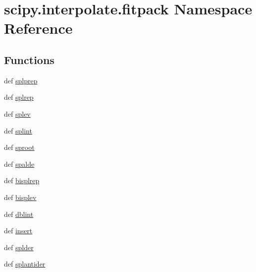 \hypertarget{namespacescipy_1_1interpolate_1_1fitpack}{}\section{scipy.\+interpolate.\+fitpack Namespace Reference}
\label{namespacescipy_1_1interpolate_1_1fitpack}
\subsection*{Functions}
\begin{DoxyCompactItemize}
\item 
def \hyperlink{namespacescipy_1_1interpolate_1_1fitpack_a6a052f827f80341f9aadade357c49c21}{splprep}
\item 
def \hyperlink{namespacescipy_1_1interpolate_1_1fitpack_a2423e02d061f11d96122b40b2919d3b8}{splrep}
\item 
def \hyperlink{namespacescipy_1_1interpolate_1_1fitpack_a4fd61bcdfd051a9c4407403db623f5ef}{splev}
\item 
def \hyperlink{namespacescipy_1_1interpolate_1_1fitpack_aee75c5d8f63bdadde1e775092428bf73}{splint}
\item 
def \hyperlink{namespacescipy_1_1interpolate_1_1fitpack_ad4d36dd0002fb4920b5a0f51a8d1e2ad}{sproot}
\item 
def \hyperlink{namespacescipy_1_1interpolate_1_1fitpack_a0600e77e68e37d78ad73ef571b1e1733}{spalde}
\item 
def \hyperlink{namespacescipy_1_1interpolate_1_1fitpack_a4c3a3eba5a81c9cb39c5e716372024bf}{bisplrep}
\item 
def \hyperlink{namespacescipy_1_1interpolate_1_1fitpack_acaf6a631cf8ff9bd445bd79a7cd2a364}{bisplev}
\item 
def \hyperlink{namespacescipy_1_1interpolate_1_1fitpack_a68a8aaf2184c6401ff114d739ee5dd08}{dblint}
\item 
def \hyperlink{namespacescipy_1_1interpolate_1_1fitpack_adc5d6b383e2e2e68e88cc7a15f26e82c}{insert}
\item 
def \hyperlink{namespacescipy_1_1interpolate_1_1fitpack_ab5d4a49b29435a9e5c6582c8f9089280}{splder}
\item 
def \hyperlink{namespacescipy_1_1interpolate_1_1fitpack_a5fc0ade95741252ab64cfa1de66ad64f}{splantider}
\end{DoxyCompactItemize}
